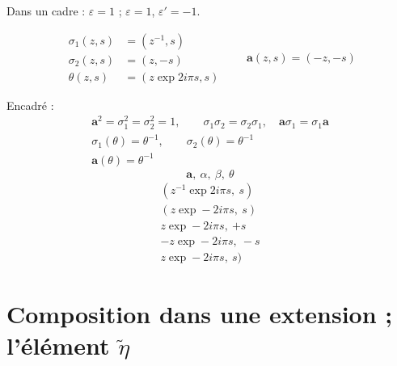 \documentclass[11pt,a4paper]{article}
\begin{document}
Dans un cadre : $\varepsilon = 1$ ; $\varepsilon = 1$, $\varepsilon' = -1$.

\[
\begin{aligned}
\sigma_1(z, s) &= (z^{-1}, s) \\
\sigma_2(z, s) &= (z, -s) \\
\theta(z, s) &= (z \exp 2i\pi s, s)
\end{aligned}
\qquad
\mathbf{a}(z, s) = (-z, -s)
\]

Encadré :
\[
\begin{gathered}
\mathbf{a}^2 = \sigma_1^2 = \sigma_2^2 = 1, \qquad \sigma_1\sigma_2 = \sigma_2\sigma_1, \quad \mathbf{a}\sigma_1 = \sigma_1\mathbf{a} \\
\sigma_1(\theta) = \theta^{-1}, \qquad \sigma_2(\theta) = \theta^{-1} \\
\mathbf{a}(\theta) = \theta^{-1}
\end{gathered}
\]
\[
\mathbf{a}, \ \alpha, \ \beta, \ \theta
\]
\[
\begin{gathered}
(z^{-1} \exp 2i\pi s, \ s) \\
(z \exp -2i\pi s, \ s) \\
z \exp -2i\pi s, \ {+s} \\
-z \exp -2i\pi s, \ -s \\
z \exp -2i\pi s, \ s)
\end{gathered}
\]

\section{Composition dans une extension ; l'élément $\tilde\eta$}
\end{document}

